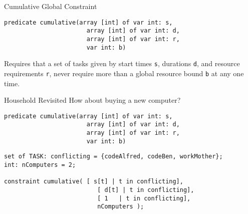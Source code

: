 \begin{frame}[fragile]{Cumulative Global Constraint}



\begin{lstlisting}
predicate cumulative(array [int] of var int: s,
                       array [int] of var int: d,
                       array [int] of var int: r,
                       var int: b)
\end{lstlisting}

\begin{parchment}
Requires that a set of tasks given by start times \texttt{s}, durations \texttt{d}, and resource requirements \texttt{r}, never require more than a global resource bound \texttt{b} at any one time.
\end{parchment}
\end{frame}


\begin{frame}[fragile]{Household Revisited}
How about buying a new computer? 
\begin{lstlisting}
predicate cumulative(array [int] of var int: s,
                       array [int] of var int: d,
                       array [int] of var int: r,
                       var int: b)
\end{lstlisting}

\begin{lstlisting}
set of TASK: conflicting = {codeAlfred, codeBen, workMother};
int: nComputers = 2;

constraint cumulative( [ s[t] | t in conflicting], 
                          [ d[t] | t in conflicting], 
                          [ 1   | t in conflicting], 
                          nComputers ); 
\end{lstlisting}

\end{frame}

